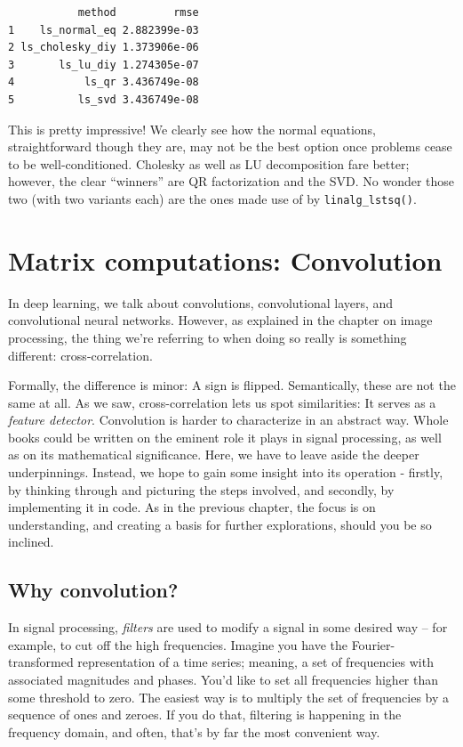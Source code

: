 \documentclass[
  letterpaper,
]{krantz}
\begin{document}
\begin{verbatim}
           method         rmse
1    ls_normal_eq 2.882399e-03
2 ls_cholesky_diy 1.373906e-06
3       ls_lu_diy 1.274305e-07
4           ls_qr 3.436749e-08
5          ls_svd 3.436749e-08
\end{verbatim}

This is pretty impressive! We clearly see how the normal equations,
straightforward though they are, may not be the best option once
problems cease to be well-conditioned. Cholesky as well as LU
decomposition fare better; however, the clear ``winners'' are QR
factorization and the SVD. No wonder those two (with two variants each)
are the ones made use of by \texttt{linalg\_lstsq()}.

\hypertarget{sec:matrix-computations-2}{%
\chapter{Matrix computations:
Convolution}\label{sec:matrix-computations-2}}

In deep learning, we talk about convolutions, convolutional layers, and
convolutional neural networks. However, as explained in the chapter on
image processing, the thing we're referring to when doing so really is
something different: cross-correlation.

Formally, the difference is minor: A sign is flipped. Semantically,
these are not the same at all. As we saw, cross-correlation lets us spot
similarities: It serves as a \emph{feature detector}. Convolution is
harder to characterize in an abstract way. Whole books could be written
on the eminent role it plays in signal processing, as well as on its
mathematical significance. Here, we have to leave aside the deeper
underpinnings. Instead, we hope to gain some insight into its operation
- firstly, by thinking through and picturing the steps involved, and
secondly, by implementing it in code. As in the previous chapter, the
focus is on understanding, and creating a basis for further
explorations, should you be so inclined.

\hypertarget{why-convolution}{%
\section{\texorpdfstring{Why
convolution?}{Why convolution?}}\label{why-convolution}}

In signal processing, \emph{filters} are used to modify a signal in some
desired way -- for example, to cut off the high frequencies. Imagine you
have the Fourier-transformed representation of a time series; meaning, a
set of frequencies with associated magnitudes and phases. You'd like to
set all frequencies higher than some threshold to zero. The easiest way
is to multiply the set of frequencies by a sequence of ones and zeroes.
If you do that, filtering is happening in the frequency domain, and
often, that's by far the most convenient way.
\end{document}
